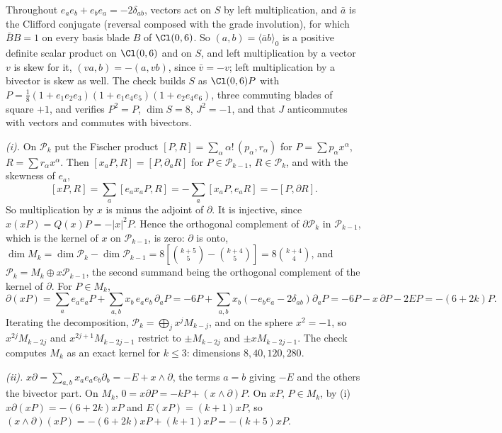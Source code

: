 Throughout $e_{a}e_{b} + e_{b}e_{a} = -2\delta_{ab}$, vectors act on $S$ by left multiplication, and $\bar{a}$ is the Clifford conjugate (reversal composed with the grade involution), for which $\bar{B}B = 1$ on every basis blade $B$ of $\Cl(0,6)$. So $(a, b) = \langle\bar{a}b\rangle_{0}$ is a positive definite scalar product on $\Cl(0,6)$ and on $S$, and left multiplication by a vector $v$ is skew for it, $(va, b) = -(a, vb)$, since $\bar{v} = -v$; left multiplication by a bivector is skew as well. The check builds $S$ as $\Cl(0,6)P$ with $P = \tfrac18(1 + e_{1}e_{2}e_{3})(1 + e_{1}e_{4}e_{5})(1 + e_{2}e_{4}e_{6})$, three commuting blades of square $+1$, and verifies $P^{2} = P$, $\dim S = 8$, $J^{2} = -1$, and that $J$ anticommutes with vectors and commutes with bivectors.

\emph{(i).} On $\mathcal{P}_{k}$ put the Fischer product $[P, R] = \sum_{\alpha}\alpha!\,(p_{\alpha}, r_{\alpha})$ for $P = \sum p_{\alpha}x^{\alpha}$, $R = \sum r_{\alpha}x^{\alpha}$. Then $[x_{a}P, R] = [P, \partial_{a}R]$ for $P \in \mathcal{P}_{k-1}$, $R \in \mathcal{P}_{k}$, and with the skewness of $e_{a}$,
\[
[xP, R] = \sum_{a}[e_{a}x_{a}P, R] = -\sum_{a}[x_{a}P, e_{a}R] = -[P, \partial R] .
\]
So multiplication by $x$ is minus the adjoint of $\partial$. It is injective, since $x(xP) = Q(x)P = -|x|^{2}P$. Hence the orthogonal complement of $\partial\mathcal{P}_{k}$ in $\mathcal{P}_{k-1}$, which is the kernel of $x$ on $\mathcal{P}_{k-1}$, is zero: $\partial$ is onto, $\dim M_{k} = \dim\mathcal{P}_{k} - \dim\mathcal{P}_{k-1} = 8[\binom{k+5}{5} - \binom{k+4}{5}] = 8\binom{k+4}{4}$, and $\mathcal{P}_{k} = M_{k} \oplus x\mathcal{P}_{k-1}$, the second summand being the orthogonal complement of the kernel of $\partial$. For $P \in M_{k}$,
\[
\partial(xP) = \sum_{a}e_{a}e_{a}P + \sum_{a,b}x_{b}\,e_{a}e_{b}\,\partial_{a}P = -6P + \sum_{a,b}x_{b}(-e_{b}e_{a} - 2\delta_{ab})\partial_{a}P = -6P - x\,\partial P - 2EP = -(6 + 2k)P .
\]
Iterating the decomposition, $\mathcal{P}_{k} = \bigoplus_{j}x^{j}M_{k-j}$, and on the sphere $x^{2} = -1$, so $x^{2j}M_{k-2j}$ and $x^{2j+1}M_{k-2j-1}$ restrict to $\pm M_{k-2j}$ and $\pm xM_{k-2j-1}$. The check computes $M_{k}$ as an exact kernel for $k \le 3$: dimensions $8, 40, 120, 280$.

\emph{(ii).} $x\partial = \sum_{a,b}x_{a}e_{a}e_{b}\partial_{b} = -E + x \wedge \partial$, the terms $a = b$ giving $-E$ and the others the bivector part. On $M_{k}$, $0 = x\partial P = -kP + (x \wedge \partial)P$. On $xP$, $P \in M_{k}$, by (i) $x\partial(xP) = -(6 + 2k)xP$ and $E(xP) = (k+1)xP$, so $(x \wedge \partial)(xP) = -(6 + 2k)xP + (k + 1)xP = -(k + 5)xP$.

